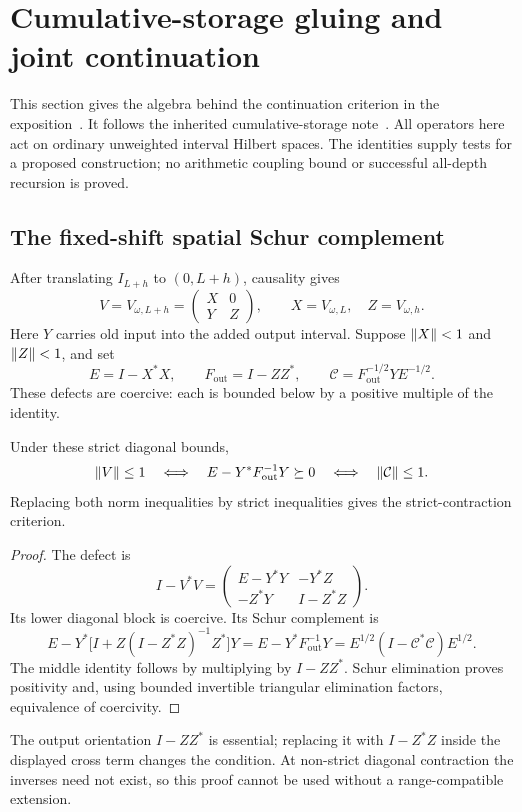\section{Cumulative-storage gluing and joint continuation}\label{sec:continuation}

This section gives the algebra behind the continuation criterion in
the exposition~\cite{Exposition}. It follows the inherited
cumulative-storage note~\cite{CumulativePath}. All operators here
act on ordinary unweighted interval Hilbert spaces. The identities
supply tests for a proposed construction; no arithmetic coupling
bound or successful all-depth recursion is proved.

\subsection{The fixed-shift spatial Schur complement}

After translating $I_{L+h}$ to $(0,L+h)$, causality gives
\begin{equation}\label{eq:si-block}
 V=V_{\omega,L+h}=
 \begin{pmatrix}X&0\\Y&Z\end{pmatrix},
 \qquad X=V_{\omega,L},\quad Z=V_{\omega,h}.
\end{equation}
Here $Y$ carries old input into the added output interval.
Suppose $\left\lVert X\right\rVert<1$ and $\left\lVert Z\right\rVert<1$, and set
\[
 E=I-X^*X,\qquad F_{\mathrm{out}}=I-ZZ^*,
 \qquad \mathcal C=F_{\mathrm{out}}^{-1/2}YE^{-1/2}.
\]
These defects are coercive: each is bounded below by a positive
multiple of the identity.

\begin{proposition}\label{prop:si-gluing}
Under these strict diagonal bounds,
\begin{equation}\label{eq:si-gluing}
 \left\lVert V\right\rVert\leq1
 \quad\Longleftrightarrow\quad
 E-Y^*F_{\mathrm{out}}^{-1}Y\succeq0
 \quad\Longleftrightarrow\quad\left\lVert\mathcal C\right\rVert\leq1.
\end{equation}
Replacing both norm inequalities by strict inequalities gives
the strict-contraction criterion.
\end{proposition}
\begin{proof}
The defect is
\[
 I-V^*V=
 \begin{pmatrix}
 E-Y^*Y&-Y^*Z\\
 -Z^*Y&I-Z^*Z
 \end{pmatrix}.
\]
Its lower diagonal block is coercive. Its Schur complement is
\[
 E-Y^*\bigl[I+Z(I-Z^*Z)^{-1}Z^*\bigr]Y
 =E-Y^*F_{\mathrm{out}}^{-1}Y
 =E^{1/2}(I-\mathcal C^*\mathcal C)E^{1/2}.
\]
The middle identity follows by multiplying by $I-ZZ^*$.
Schur elimination proves positivity and, using bounded invertible
triangular elimination factors, equivalence of coercivity.
\end{proof}
The output orientation $I-ZZ^*$ is essential; replacing it with
$I-Z^*Z$ inside the displayed cross term changes the condition.
At non-strict diagonal contraction the inverses need not exist,
so this proof cannot be used without a range-compatible extension.

